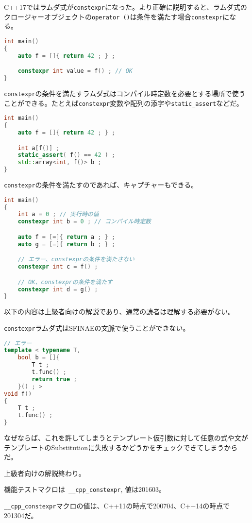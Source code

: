 %

C++17ではラムダ式が\lstinline!constexpr!になった。より正確に説明すると、ラムダ式のクロージャーオブジェクトの\lstinline!operator ()!は条件を満たす場合\lstinline!constexpr!になる。

\begin{lstlisting}[language=C++]
int main()
{
    auto f = []{ return 42 ; } ;

    constexpr int value = f() ; // OK
}
\end{lstlisting}

\lstinline!constexpr!の条件を満たすラムダ式はコンパイル時定数を必要とする場所で使うことができる。たとえば\lstinline!constexpr!変数や配列の添字や\lstinline!static_assert!などだ。

\begin{lstlisting}[language=C++]
int main()
{
    auto f = []{ return 42 ; } ;

    int a[f()] ;
    static_assert( f() == 42 ) ;
    std::array<int, f()> b ;
}
\end{lstlisting}

\lstinline!constexpr!の条件を満たすのであれば、キャプチャーもできる。

\begin{lstlisting}[language=C++]
int main()
{
    int a = 0 ; // 実行時の値
    constexpr int b = 0 ; // コンパイル時定数 

    auto f = [=]{ return a ; } ;
    auto g = [=]{ return b ; } ;

    // エラー、constexprの条件を満たさない
    constexpr int c = f() ;

    // OK、constexprの条件を満たす
    constexpr int d = g() ;
}
\end{lstlisting}

以下の内容は上級者向けの解説であり、通常の読者は理解する必要がない。

\lstinline!constexpr!ラムダ式はSFINAEの文脈で使うことができない。

\begin{lstlisting}[language=C++]
// エラー
template < typename T,
    bool b = []{
        T t ;
        t.func() ;
        return true ;
    }() ; >
void f()
{
    T t ;
    t.func() ;
}
\end{lstlisting}

なぜならば、これを許してしまうとテンプレート仮引数に対して任意の式や文がテンプレートのSubstitutionに失敗するかどうかをチェックできてしまうからだ。

上級者向けの解説終わり。

機能テストマクロは~\lstinline!__cpp_constexpr!, 値は201603。

\lstinline!__cpp_constexpr!マクロの値は、C++11の時点で200704、C++14の時点で201304だ。
